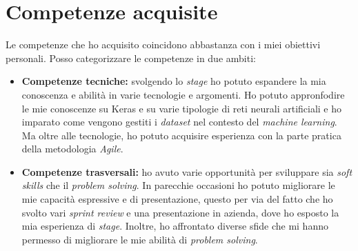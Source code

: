 \newpage

\section{Competenze acquisite}\label{sec:expertise-gained}\noindent
Le competenze che ho acquisito coincidono abbastanza con i miei obiettivi personali.
Posso categorizzare le competenze in due ambiti:
\begin{itemize}
    \item \textbf{Competenze tecniche:} svolgendo lo \textit{stage} ho potuto espandere la mia conoscenza e abilità in varie tecnologie e argomenti. Ho potuto appronfodire le mie conoscenze su Keras e su varie tipologie di reti neurali artificiali e ho imparato come vengono gestiti i \textit{dataset} nel contesto del \textit{machine learning}. Ma oltre alle tecnologie, ho potuto acquisire esperienza con la parte pratica della metodologia \textit{Agile}.
    \item \textbf{Competenze trasversali:} ho avuto varie opportunità per sviluppare sia \textit{soft skills} che il \textit{problem solving}. In parecchie occasioni ho potuto migliorare le mie capacità espressive e di presentazione, questo per via del fatto che ho svolto vari \textit{sprint review} e una presentazione in azienda, dove ho esposto la mia esperienza di \textit{stage}. Inoltre, ho affrontato diverse sfide che mi hanno permesso di migliorare le mie abilità di \textit{problem solving}.
\end{itemize}


